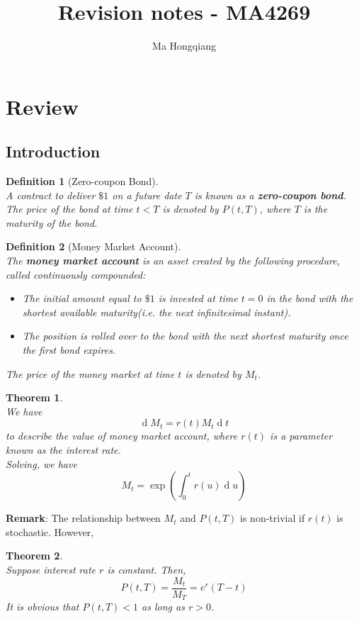 \documentclass[12pt]{article}
\newtheorem{definition}{Definition}[section]
\newtheorem{theorem}{Theorem}[section]
\theoremstyle{definition}
\DeclareMathOperator{\diff}{d}
\begin{document}
\title{Revision notes - MA4269}
\author{Ma Hongqiang}
\maketitle
\tableofcontents


\twocolumn
\section{Review}
\subsection{Introduction}
\begin{definition}[Zero-coupon Bond]
\hfill\\\normalfont A contract to deliver $\$1$ on a future date $T$ is known as a \textbf{zero-coupon bond}.\\
The price of the bond at time $t<T$ is denoted by $P(t,T)$, where $T$ is the maturity of the bond.
\end{definition}
\begin{definition}[Money Market Account]
\hfill\\\normalfont The \textbf{money market account} is an asset created by the following procedure, called continuously compounded:
\begin{itemize}
  \item The initial amount equal to $\$1$ is invested at time $t=0$ in the bond with the shortest available maturity(i.e. the next infinitesimal instant).
  \item The position is rolled over to the bond with the next shortest maturity once the first bond expires.
\end{itemize}
The price of the money market at time $t$ is denoted by $M_t$.
\end{definition}
\begin{theorem}
\hfill\\\normalfont We have
\[
\diff M_t = r(t)M_t\diff t
\]
to describe the value of money market account, where $r(t)$ is a parameter known as the interest rate.\\
Solving, we have
\[
M_t = \exp\left(\int_0^t r(u)\diff u\right)
\]
\end{theorem}
\textbf{Remark}: The relationship between $M_t$ and $P(t,T)$ is non-trivial if $r(t)$ is stochastic. However, 
\begin{theorem}
\hfill\\\normalfont Suppose interest rate $r$ is constant. Then, 
\[
P(t,T)=\frac{M_t}{M_T} = e^r(T-t)
\]
It is obvious that $P(t,T)<1$ as long as $r>0$.
\end{theorem}
\end{document}
